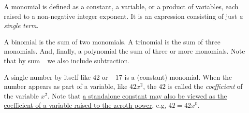 \documentclass[
  a4paper,
]{article}
\begin{document}
A monomial is defined as a constant, a variable, or a product of
variables, each raised to a non-negative integer exponent. It is an
expression consisting of just \emph{a single term}.

A binomial is the sum of two monomials. A trinomial is the sum of three
monomials. And, finally, a polynomial the sum of three or more
monomials. Note that by
\href{https://swanlotus.netlify.app/blogs/the-two-most-important-numbers-zero-and-one}{sum\_
we also include subtraction}.

A single number by itself like \(42\) or \(-17\) is a (constant)
monomial. When the number appears as part of a variable, like \(42x^2\),
the \(42\) is called the \emph{coefficient} of the variable \(x^2\).
Note that
\href{https://swanlotus.netlify.app/blogs/the-two-most-important-numbers-zero-and-one}{a
standalone constant may also be viewed as the coefficient of a variable
raised to the zeroth power}, e.g, \(42 = 42x^{0}\).
\end{document}
